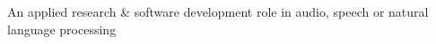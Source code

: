 

\begin{cvskills}

  \cvskill
    {}
    {An applied research \& software development role in audio, speech or natural language processing}

\end{cvskills}